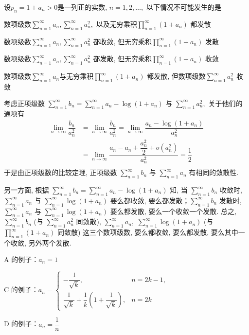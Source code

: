 \begin{question}
  设$p_n = 1 + a_n > 0$是一列正的实数, $n = 1, 2, \dots,$ 以下情况不可能发生的是 \paren[B]

  \begin{choices}
    \item 数项级数$\displaystyle \sum\limits_{n=1}^{\infty} a_n, \sum\limits_{n=1}^{\infty} a_n^2,$ 以及无穷乘积$\displaystyle \prod\limits_{n=1}^{\infty} (1 + a_n)$ 都发散
    \item 数项级数$\displaystyle \sum\limits_{n=1}^{\infty} a_n, \sum\limits_{n=1}^{\infty} a_n^2$ 都收敛, 但无穷乘积$\displaystyle \prod\limits_{n=1}^{\infty} (1 + a_n)$ 发散
    \item 数项级数$\displaystyle \sum\limits_{n=1}^{\infty} a_n, \sum\limits_{n=1}^{\infty} a_n^2$ 都发散, 但无穷乘积$\displaystyle \prod\limits_{n=1}^{\infty} (1 + a_n)$ 收敛
    \item 数项级数$\displaystyle \sum\limits_{n=1}^{\infty} a_n$与无穷乘积$\displaystyle \prod\limits_{n=1}^{\infty} (1 + a_n)$ 都发散, 但数项级数$\displaystyle \sum\limits_{n=1}^{\infty} a_n^2$ 收敛
  \end{choices}
\end{question}

\begin{solution}
  考虑正项级数 $\sum\limits_{n=1}^{\infty} b_n = \sum\limits_{n=1}^{\infty} a_n - \log(1 + a_n)$ 与 $\sum\limits_{n=1}^{\infty} a_n^2,$ 关于他们的通项有
  \begin{align*}
    \lim\limits_{n\to\infty} \dfrac{b_n}{a_n^2} & = \lim\limits_{n\to\infty} \dfrac{b_n}{a_n^2} = \lim\limits_{n\to\infty} \dfrac{a_n - \log(1 + a_n)}{a_n^2} \\
    & = \lim\limits_{n\to\infty} \dfrac{a_n - a_n + \dfrac{a_n^2}{2} + o(a_n^2)}{a_n^2} = \dfrac{1}{2} \\
  \end{align*}
  于是由正项级数的比较定理, 正项级数 $\sum\limits_{n=1}^{\infty} b_n$ 与 $\sum\limits_{n=1}^{\infty} a_n$ 有相同的敛散性.

  另一方面, 根据 $\sum\limits_{n=1}^{\infty} b_n = \sum\limits_{n=1}^{\infty} a_n - \log(1 + a_n)$ 知, 当 $\sum\limits_{n=1}^{\infty} b_n$ 收敛时, $\sum\limits_{n=1}^{\infty} a_n$ 与 $\sum\limits_{n=1}^{\infty} \log(1 + a_n)$ 要么都收敛, 要么都发散；$\sum\limits_{n=1}^{\infty} b_n$ 发散时, $\sum\limits_{n=1}^{\infty} a_n$ 与 $\sum\limits_{n=1}^{\infty} \log(1 + a_n)$ 要么都发散, 要么一个收敛一个发散. 总之, $\sum\limits_{n=1}^{\infty} b_n$ (与 $\sum\limits_{n=1}^{\infty} a_n^2$ 同敛散), $\sum\limits_{n=1}^{\infty} a_n,$ $\sum\limits_{n=1}^{\infty} \log(1 + a_n)$ (与 $\prod\limits_{n=1}^{\infty} (1 + a_n)$ 同敛散) 这三个数项级数, 要么都收敛, 要么都发散, 要么其中一个收敛, 另外两个发散.

  A 的例子：$a_n = 1$

  C 的例子：$a_n = \begin{cases}
    -\dfrac{1}{\sqrt{k}}, & n = 2k -1, \\
    \dfrac{1}{\sqrt{k}} + \dfrac{1}{k} \left( 1 + \dfrac{1}{\sqrt{k}} \right), & n = 2k
  \end{cases}$

  D 的例子：$a_n = \dfrac{1}{n}$
\end{solution}


